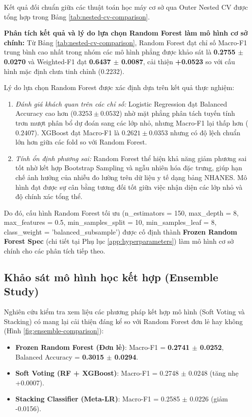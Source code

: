 Kết quả đối chuẩn giữa các thuật toán học máy cơ sở qua Outer Nested CV được tổng hợp trong Bảng \ref{tab:nested-cv-comparison}.



\textbf{Phân tích kết quả và lý do lựa chọn Random Forest làm mô hình cơ sở chính:}
Từ Bảng \ref{tab:nested-cv-comparison}, Random Forest đạt chỉ số Macro-F1 trung bình cao nhất trong nhóm các mô hình phẳng được khảo sát là \textbf{0.2755 $\pm$ 0.0270} và Weighted-F1 đạt \textbf{0.6437 $\pm$ 0.0087}, cải thiện \textbf{+0.0523} so với cấu hình mặc định chưa tinh chỉnh ($0.2232$).

Lý do lựa chọn Random Forest được xác định dựa trên kết quả thực nghiệm:
\begin{enumerate}
    \item \textit{Đánh giá khách quan trên các chỉ số:} Logistic Regression đạt Balanced Accuracy cao hơn ($0.3253 \pm 0.0532$) nhờ mặt phẳng phân tách tuyến tính trơn mượt phân bổ dự đoán sang các lớp nhỏ, nhưng Macro-F1 lại thấp hơn ($0.2407$). XGBoost đạt Macro-F1 là $0.2621 \pm 0.0353$ nhưng có độ lệch chuẩn lớn hơn giữa các fold so với Random Forest.
    \item \textit{Tính ổn định phương sai:} Random Forest thể hiện khả năng giảm phương sai tốt nhờ kết hợp Bootstrap Sampling và ngẫu nhiên hóa đặc trưng, giúp hạn chế ảnh hưởng của nhiễu đo lường trên dữ liệu y tế dạng bảng NHANES. Mô hình đạt được sự cân bằng tương đối tốt giữa việc nhận diện các lớp nhỏ và độ chính xác tổng thể.
\end{enumerate}

Do đó, cấu hình Random Forest tối ưu (\textnormal{n\_estimators = 150, max\_depth = 8, max\_features = 0.5, min\_samples\_split = 10, min\_samples\_leaf = 8, class\_weight = 'balanced\_subsample'}) được cố định thành \textbf{Frozen Random Forest Spec} (chi tiết tại Phụ lục \ref{app:hyperparameters}) làm mô hình cơ sở chính cho các phân tích tiếp theo.

\subsection{Khảo sát mô hình học kết hợp (Ensemble Study)}
Nghiên cứu kiểm tra xem liệu các phương pháp kết hợp mô hình (Soft Voting và Stacking) có mang lại cải thiện đáng kể so với Random Forest đơn lẻ hay không (Hình \ref{fig:ensemble-comparison}):
\begin{itemize}
    \item \textbf{Frozen Random Forest (Đơn lẻ)}: Macro-F1 = \textbf{0.2741 $\pm$ 0.0252}, Balanced Accuracy = \textbf{0.3015 $\pm$ 0.0294}.
    \item \textbf{Soft Voting (RF + XGBoost)}: Macro-F1 = 0.2748 $\pm$ 0.0248 (tăng nhẹ +0.0007).
    \item \textbf{Stacking Classifier (Meta-LR)}: Macro-F1 = 0.2585 $\pm$ 0.0226 (giảm -0.0156).
\end{itemize}

